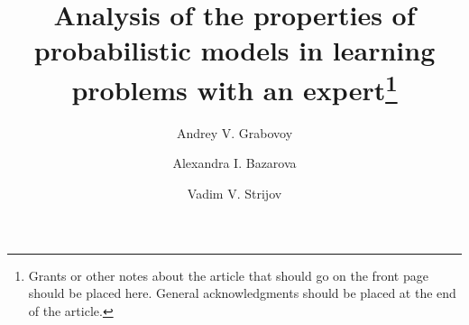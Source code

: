 %
%
%
%
%
\RequirePackage{fix-cm}
%
\documentclass[smallextended]{svjour3}       %
%
\smartqed  %
%
\usepackage{graphicx}
\usepackage{subfig}
\usepackage{amsmath}
\usepackage{amsfonts}
%
%
%
%
%


\title{Analysis of the properties of probabilistic models in learning problems with an expert\thanks{Grants or other notes
about the article that should go on the front page should be
placed here. General acknowledgments should be placed at the end of the article.}
}
\subtitle{}


\author{Andrey V. Grabovoy        \and
            Alexandra I. Bazarova  \and
            Vadim V. Strijov
}

